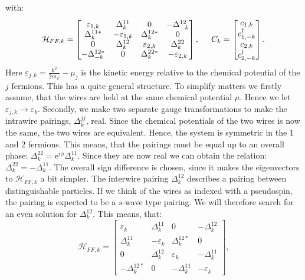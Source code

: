 with:
\begin{equation}
\mathcal{H}_{FF,k} = \begin{bmatrix} \varepsilon_{1,k} & \Delta^{11}_k      & 0                 & -\Delta^{12}_{-k} \\ 
                                     \Delta^{11 *}_k   & -\varepsilon_{1,k} & \Delta^{12*}_k    & 0 \\ 
                                    0                  & \Delta^{12}_k      & \varepsilon_{2,k} & \Delta^{22}_k \\ 
                                     -\Delta^{12*}_{-k}& 0                  & \Delta^{22*}_k    & -\varepsilon_{2,k} \end{bmatrix}, \hspace{0.5cm}
C_k =  \begin{bmatrix} c_{1,k} \\ c^\dagger_{1,-k} \\ c_{2,k} \\ c^\dagger_{2,-k} \end{bmatrix}.                                     
\end{equation}
Here $\varepsilon_{j,k} = \frac{k^2}{2m_F}-\mu_j$ is the kinetic energy relative to the chemical potential of the $j$ fermions. This has a quite general structure. To simplify matters we firstly assume, that the wires are held at the same chemical potential $\mu$. Hence we let $\varepsilon_{j,k} \to \varepsilon_k$. Secondly, we make two separate gauge transformations to make the intrawire pairings, $\Delta^{jj}_k$, real. Since the chemical potentials of the two wires is now the same, the two wires are equivalent. Hence, the system is symmetric in the 1 and 2 fermions. This means, that the pairings must be equal up to an overall phase: $\Delta^{22}_k = \text{e}^{i\phi} \Delta^{11}_k$. Since they are now real we can obtain the relation: $\Delta^{22}_k = -\Delta^{11}_k$. The overall sign difference is chosen, since it makes the eigenvectors to $\mathcal{H}_{FF,k}$ a bit simpler. The interwire pairing $\Delta^{12}_k$ describes a pairing between distinguishable particles. If we think of the wires as indexed with a pseudospin, the pairing is expected to be a $s$-wave type pairing. We will therefore search for an even solution for $\Delta^{12}_k$. This means, that:
\begin{equation}
\mathcal{H}_{FF,k} = \begin{bmatrix} \varepsilon_{k}   & \Delta^{11}_k      & 0                 & -\Delta^{12}_{k} \\ 
                                     \Delta^{11}_k     & -\varepsilon_{k}   & \Delta^{12*}_k    & 0 \\ 
                                    0                  & \Delta^{12}_k      & \varepsilon_{k}   & -\Delta^{11}_k \\ 
                                     -\Delta^{12*}_{k} & 0                  & -\Delta^{11}_k     & -\varepsilon_{k} \end{bmatrix},                  
\end{equation}

